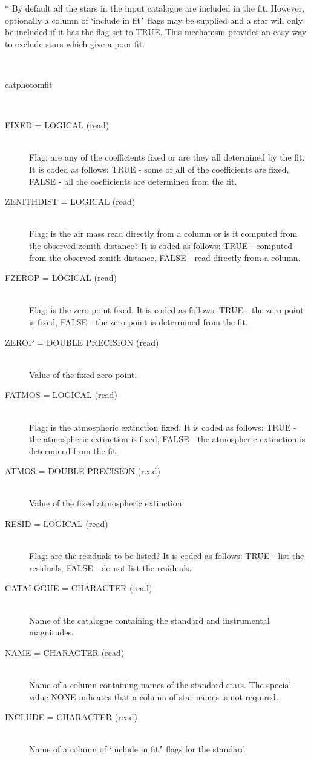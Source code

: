 \documentclass[twoside,11pt]{article}
\renewcommand{\_}{\texttt{\symbol{95}}}
\newcommand{\sstusage}[1]{\item[Usage:] \mbox{}
\\[1.3ex]{\raggedright \ssttt #1}}
\newcommand{\sstparameters}[1]{
   \item[Parameters:] \mbox{} \\
   \vspace{-3.5ex}
   \begin{description}
      #1
   \end{description}
}
\newcommand{\sstsubsection}[1]{ \item[{#1}] \mbox{} \\}
\newcommand{\sstusage}[1]{\item[Usage:]
      \begin{description}
         {\ssttt #1}
      \end{description}
      \\
   }
\newcommand{\sstparameters}[1]{
      \item[Parameters:] \\
      \begin{description}
         #1
      \end{description}
      \\
   }
\newcommand{\sstsubsection}[1]{\item[{#1}]}
\begin{document}
\begin{htmlonly}
{{      $*$ By default all the stars in the input catalogue are included in
        the fit.  However, optionally a column of `include in fit{\tt '}
        flags may be supplied and a star will only be included if it
        has the flag set to TRUE.  This mechanism provides an easy way
        to exclude stars which give a poor fit.
   }
   \sstusage{
      catphotomfit
   }
   \sstparameters{
      \sstsubsection{
         FIXED  =  LOGICAL (read)
      }{
         Flag; are any of the coefficients fixed or are they all
         determined by the fit.  It is coded as follows:
         TRUE  - some or all of the coefficients are fixed,
         FALSE - all the coefficients are determined from the fit.
      }
      \sstsubsection{
         ZENITHDIST  =  LOGICAL (read)
      }{
         Flag; is the air mass read directly from a column or is it
         computed from the observed zenith distance?  It is coded as
         follows:
         TRUE  - computed from the observed zenith distance,
         FALSE - read directly from a column.
      }
      \sstsubsection{
         FZEROP  =  LOGICAL (read)
      }{
         Flag; is the zero point fixed.  It is coded as follows:
         TRUE  - the zero point is fixed,
         FALSE - the zero point is determined from the fit.
      }
      \sstsubsection{
         ZEROP  =  DOUBLE PRECISION (read)
      }{
         Value of the fixed zero point.
      }
      \sstsubsection{
         FATMOS  =  LOGICAL (read)
      }{
         Flag; is the atmospheric extinction fixed.  It is coded as
         follows:
         TRUE  - the atmospheric extinction is fixed,
         FALSE - the atmospheric extinction is determined from the fit.
      }
      \sstsubsection{
         ATMOS  =  DOUBLE PRECISION (read)
      }{
         Value of the fixed atmospheric extinction.
      }
      \sstsubsection{
         RESID  =  LOGICAL (read)
      }{
         Flag; are the residuals to be listed?  It is coded as follows:
         TRUE  - list the residuals,
         FALSE - do not list the residuals.
      }
      \sstsubsection{
         CATALOGUE  =  CHARACTER (read)
      }{
         Name of the catalogue containing the standard and instrumental
         magnitudes.
      }
      \sstsubsection{
         NAME  =  CHARACTER (read)
      }{
         Name of a column containing names of the standard stars.
         The special value NONE indicates that a column of star names
         is not required.
      }
      \sstsubsection{
         INCLUDE  =  CHARACTER (read)
      }{
         Name of a column of `include in fit{\tt '} flags for the standard
}}}
\end{htmlonly}
\end{document}
